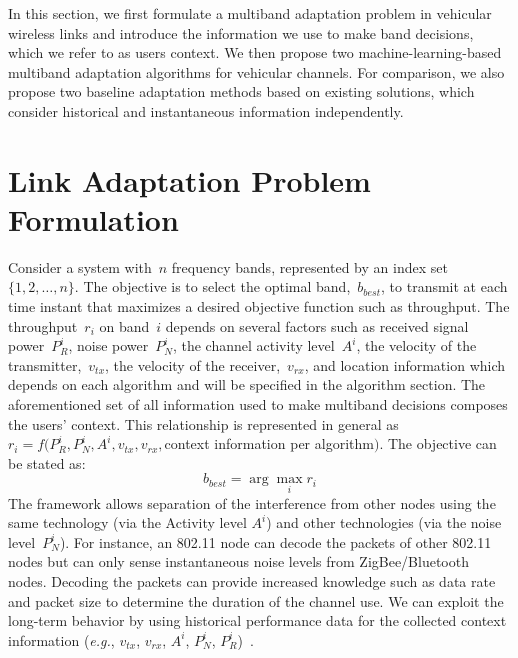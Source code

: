 

In this section, we first formulate a multiband adaptation problem in vehicular wireless links and 
introduce the information we use to make band decisions, which we refer to as users context. We then 
propose two machine-learning-based multiband adaptation algorithms for vehicular channels. For 
comparison, we also propose two baseline adaptation methods based on existing solutions, which 
consider historical and instantaneous information independently.


\section{Link Adaptation Problem Formulation}

Consider a system with~$n$ frequency bands, represented by an index set~$\{1,2, \ldots, n\}$. The 
objective is to select the optimal band,~$b_{best}$, to transmit at each time instant that maximizes 
a desired objective function such as throughput. The throughput~$r_i$ on band~$i$ depends on several 
factors such as received signal power~$P_R^i$, noise power~$P_N^i$, the channel activity level~$A^i$, 
the velocity of the transmitter,~$v_{tx}$, the velocity of the receiver,~$v_{rx}$, and location 
information which depends on each algorithm and will be specified in the algorithm section. The 
aforementioned set of all information used to make multiband decisions composes the users' context. 
This relationship is represented in general as~$r_i = f(P_R^i, P_N^i, A^i, v_{tx}, v_{rx}, $context information per algorithm$)$. 
The objective can be stated as:
\begin{equation}
b_{best}= \arg \max_i r_i 
\end{equation}
The framework allows separation of the interference from other nodes using the same technology
(via the Activity level $A^i$) and other technologies (via the noise level~$P_N^i$). For instance, 
an 802.11 node can decode the packets of other 802.11 nodes but can only sense instantaneous noise 
levels from ZigBee/Bluetooth nodes. Decoding the packets can provide increased knowledge such as 
data rate and packet size to determine the duration of the channel use. 
We can exploit the long-term behavior by using historical performance data for the collected context 
information ({\it e.g.}, $v_{tx}$, $v_{rx}$, $A^i$, $P_N^i$, $P_R^i$)~\cite{meikle2012global}. 


